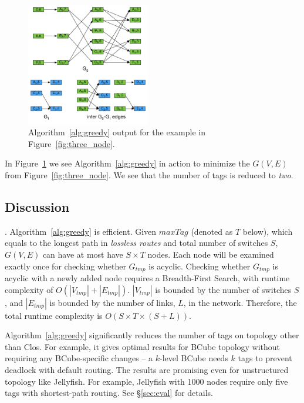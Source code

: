 \begin{figure}[t]
	\centering
	\includegraphics[width=0.48\textwidth] {figs/alo_walkthrough_c}
	\caption{Algorithm~\ref{alg:greedy} output for the example in Figure~\ref{fig:three_node}.}
	\label{fig:greedy}
\end{figure}

In  Figure~\ref{fig:greedy} we see Algorithm~\ref{alg:greedy} in action to
minimize the $G(V,E)$ from Figure~\ref{fig:three_node}. We see that the number
of tags is reduced to {\em two}.

\subsection {Discussion}
\label{subsec:caveats}

. Algorithm~\ref{alg:greedy} is efficient. Given $maxTag$ 
(denoted as $T$ below), which equals to the longest path in {\em lossless routes} and
total number of switches $S$, $G(V,E)$ can have at most have $S \times T$ nodes.
Each node will be examined exactly once for checking whether $G_{tmp}$ is acyclic.
Checking whether $G_{tmp}$ is acyclic with a newly added node requires a Breadth-First Search,
with runtime complexity of $O(|V_{tmp}| + |E_{tmp}|)$. $|V_{tmp}|$ is bounded by the number
of switches $S$, and $|E_{tmp}|$ is bounded by the number of links, $L$, in the network.
Therefore, the total runtime complexity is $O(S \times T \times (S+L))$.

 Algorithm~\ref{alg:greedy} significantly reduces the
number of tags on topology other than Clos. For example, it gives optimal
results for BCube topology without requiring any BCube-specific changes -- a
$k$-level BCube needs $k$ tags to prevent deadlock with default routing. The
results are promising even for unstructured topology like Jellyfish.  For
example, Jellyfish with 1000 nodes require only five tags with shortest-path
routing. See \S\ref{sec:eval} for details.

